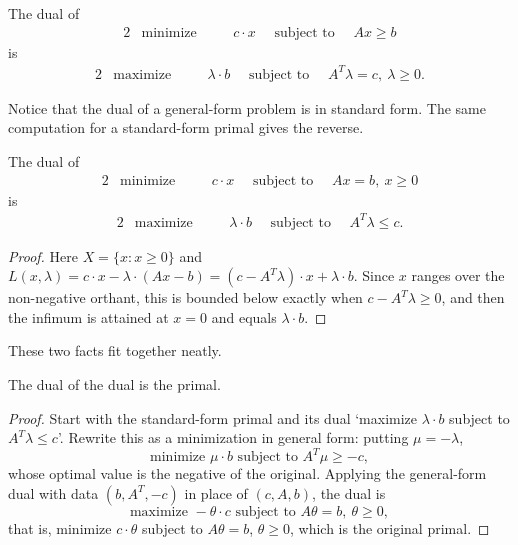 \documentclass[a4paper]{scrartcl}
\begin{document}
\begin{proposition}
    The dual of
    \begin{alignat*}{2}
        & \text{minimize} \quad && c\cdot x \quad\text{ subject to } \quad Ax \geq b
    \end{alignat*}
    is
    \begin{alignat*}{2}
        & \text{maximize} \quad && \lambda \cdot b \quad\text{ subject to }\quad A^T\lambda = c,\ \lambda \geq 0.
    \end{alignat*}
\end{proposition}

Notice that the dual of a general-form problem is in standard form. The same computation for a standard-form primal gives the reverse.

\begin{proposition}
    The dual of
    \begin{alignat*}{2}
        & \text{minimize} \quad && c\cdot x \quad\text{ subject to } \quad Ax = b,\ x \geq 0
    \end{alignat*}
    is
    \begin{alignat*}{2}
        & \text{maximize} \quad && \lambda \cdot b \quad\text{ subject to }\quad A^T\lambda \leq c.
    \end{alignat*}
\end{proposition}
\begin{proof}
    Here $X = \{x : x \geq 0\}$ and $L(x,\lambda) = c\cdot x - \lambda\cdot(Ax - b) = (c - A^T\lambda)\cdot x + \lambda\cdot b$. Since $x$ ranges over the non-negative orthant, this is bounded below exactly when $c - A^T\lambda \geq 0$, and then the infimum is attained at $x = 0$ and equals $\lambda\cdot b$.
\end{proof}

These two facts fit together neatly.

\begin{proposition}
    The dual of the dual is the primal.
\end{proposition}
\begin{proof}
    Start with the standard-form primal and its dual `maximize $\lambda\cdot b$ subject to $A^T\lambda \leq c$'. Rewrite this as a minimization in general form: putting $\mu = -\lambda$,
    $$
    \text{minimize } \mu\cdot b \text{ subject to } A^T\mu \geq -c,
    $$
    whose optimal value is the negative of the original. Applying the general-form dual with data $(b, A^T, -c)$ in place of $(c, A, b)$, the dual is
    $$
    \text{maximize } -\theta\cdot c \text{ subject to } A\theta = b,\ \theta \geq 0,
    $$
    that is, minimize $c\cdot\theta$ subject to $A\theta = b$, $\theta \geq 0$, which is the original primal.
\end{proof}
\end{document}
